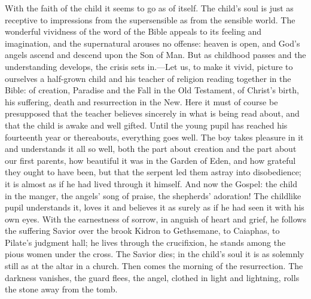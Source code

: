 \documentclass[12pt,a4paper,openany]{book}
\newcommand{\opage}[1]{\marginnote{\footnotesize\textit{[#1]}}}
\begin{document}
With the faith of the child it seems to go as of itself. The child's
soul is just as receptive to impressions from the supersensible as from
the sensible world. The wonderful vividness of the word of the Bible
appeals to its feeling and imagination, and the supernatural arouses no
offense: heaven is open, and God's angels ascend and descend upon the Son
of Man. But as childhood passes and the understanding develops, the
crisis sets in.---Let us, to make it vivid, picture to ourselves a
half-grown child and his teacher of religion reading together in the
Bible: of creation, Paradise and the Fall in the Old Testament, of
Christ's birth, his suffering, death and resurrection in the New. Here it
must of course be presupposed that the teacher believes sincerely in what
is being read about, and that the child is awake and well gifted. Until
the young pupil has reached his fourteenth year or thereabouts,
everything goes well. The boy takes pleasure in it and understands it all
so well, both the part about creation and the part about our first
parents, how beautiful it was in the Garden of Eden, and how grateful they
ought to have been, but that the serpent \opage{43}led them astray into
disobedience; it is almost as if he had lived through it himself. And now
the Gospel: the child in the manger, the angels' song of praise, the
shepherds' adoration! The childlike pupil understands it, loves it and
believes it as surely as if he had seen it with his own eyes. With the
earnestness of sorrow, in anguish of heart and grief, he follows the
suffering Savior over the brook Kidron to Gethsemane, to Caiaphas, to
Pilate's judgment hall; he lives through the crucifixion, he stands among
the pious women under the cross. The Savior dies; in the child's soul it
is as solemnly still as at the altar in a church. Then comes the morning
of the resurrection. The darkness vanishes, the guard flees, the angel,
clothed in light and lightning, rolls the stone away from the tomb.
\end{document}
